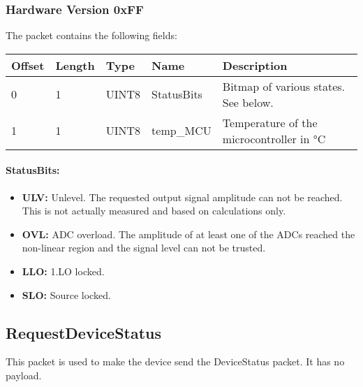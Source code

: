 \documentclass[a4paper,11pt]{article}
\newcommand{\bitrect}[2]{
  \begin{pgfonlayer}{foreground}
    \draw [thick] (0,0) rectangle (#1,1);
    \pgfmathsetmacro\result{#1-1}
    \foreach \x in {1,...,\result}
      \draw [thick] (\x,1) -- (\x, 0.8);
  \end{pgfonlayer}
  \bitlabels{#1}{#2}
}
\newcommand{\rwbits}[3]{
  \draw [thick] (#1,0) rectangle ++(#2,1) node[pos=0.5]{#3};
  \pgfmathsetmacro\start{#1+0.5}
  \pgfmathsetmacro\finish{#1+#2-0.5}
}
\newcommand{\robits}[3]{
  \begin{pgfonlayer}{background}
    \draw [thick, fill=lightgray] (#1,0) rectangle ++(#2,1) node[pos=0.5]{#3};
  \end{pgfonlayer}
  \pgfmathsetmacro\start{#1+0.5}
  \pgfmathsetmacro\finish{#1+#2-0.5}
}
\newcommand{\bitlabels}[2]{
  \foreach \bit in {1,...,#1}{
     \pgfmathsetmacro\result{#2}
     \node [above] at (\bit-0.5, 1) {\pgfmathprintnumber{\result}};
   }
}
\begin{document}
\subsubsection{Hardware Version 0xFF}
The packet contains the following fields:
\begin{ThreePartTable}
\setlength\tabcolsep{3pt}

\begin{longtable}{p{} |  p{}  |  p{}| p{} | p{}}
\toprule
\textbf{Offset} &\textbf{Length} &\textbf{Type} & \textbf{Name} &\textbf{Description} \\ 
\hline
\endhead
\midrule[\heavyrulewidth]
\endfoot  
\midrule[\heavyrulewidth]
\endlastfoot

0 & 1 & UINT8 & StatusBits & Bitmap of various states. See below.\\
1 & 1 & UINT8 & temp\_MCU & Temperature of the microcontroller in \si{\celsius} \\
\end{longtable}   
\end{ThreePartTable}

\paragraph{StatusBits:}
\begin{center}
\end{center}
\begin{itemize}
\item \textbf{ULV:} Unlevel. The requested output signal amplitude can not be reached. This is not actually measured and based on calculations only.
\item \textbf{OVL:} ADC overload. The amplitude of at least one of the ADCs reached the non-linear region and the signal level can not be trusted.
\item \textbf{LLO:} 1.LO locked.
\item \textbf{SLO:} Source locked.
\end{itemize}

\subsection{RequestDeviceStatus}
This packet is used to make the device send the DeviceStatus packet. It has no payload.
\end{document}
